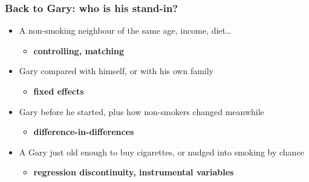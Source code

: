\begin{frame}
\frametitle{Back to Gary: who is his stand-in?}
\centering

\vspace{10pt}
\begin{itemize}
  \item<1-> A non-smoking neighbour of the same age, income, diet\ldots
  \begin{itemize}
    \item<1-> \textbf{controlling, matching}
  \end{itemize}
  \vspace{8pt}
  \item<2-> Gary compared with himself, or with his own family
  \begin{itemize}
    \item<2-> \textbf{fixed effects}
  \end{itemize}
  \vspace{8pt}
  \item<3-> Gary before he started, plus how non-smokers changed meanwhile
  \begin{itemize}
    \item<3-> \textbf{difference-in-differences}
  \end{itemize}
  \vspace{8pt}
  \item<4-> A Gary just old enough to buy cigarettes, or nudged into smoking by chance
  \begin{itemize}
    \item<4-> \textbf{regression discontinuity, instrumental variables}
  \end{itemize}
\end{itemize}

\end{frame}

